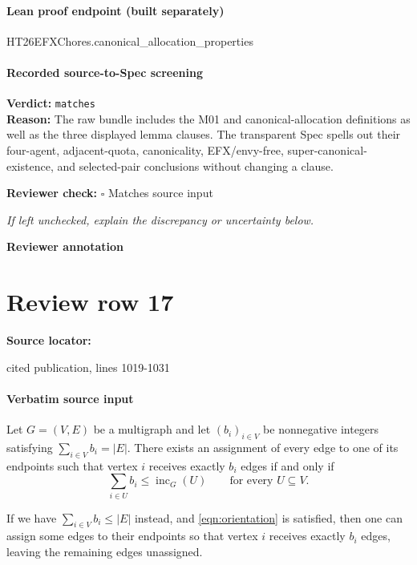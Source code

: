 \documentclass[10pt]{article}
\newcommand{\reviewerbox}{%
  \par\noindent\fbox{\parbox{0.96\linewidth}{\rule{0pt}{0.38in}}}\par
}
\newcommand{\reviewmatch}[1]{%
  \par\noindent\textbf{Reviewer check:} $\square$\; #1\par
  \noindent\emph{If left unchecked, explain the discrepancy or uncertainty below.}\par
}
\begin{document}
\paragraph{Lean proof endpoint (built separately)}\begin{ReviewVerbatim}
HT26EFXChores.canonical_allocation_properties
\end{ReviewVerbatim}

\paragraph{Recorded source-to-Spec screening}
\textbf{Verdict:} \texttt{matches}
\\
\textbf{Reason:} The raw bundle includes the M01 and canonical-allocation definitions as well as the three displayed lemma clauses. The transparent Spec spells out their four-agent, adjacent-quota, canonicality, EFX/envy-free, super-canonical-existence, and selected-pair conclusions without changing a clause.
\reviewmatch{Matches source input}
\noindent\textbf{Reviewer annotation}\par
\reviewerbox
\clearpage
\hypertarget{source-claim-0869bc0832b92b55}{}
\section*{Review row 17}
\textbf{Source locator:} {\footnotesize\raggedright cited publication, lines 1019-\allowbreak{}1031\par}
\paragraph{Verbatim source input}
\begin{ReviewVerbatim}
\begin{lemma}\label{lem:balancedorientation}
Let $G=(V,E)$ be a multigraph and let $(b_i)_{i\in V}$ be nonnegative
integers satisfying $\sum_{i\in V}b_i=|E|$.  There exists an assignment of
every edge to one of its endpoints such that vertex $i$ receives exactly
$b_i$ edges if and only if
\begin{equation}\label{eqn:orientation}
    \sum_{i\in U}b_i\le \operatorname{inc}_G(U)
 \qquad\text{for every }U\subseteq V.
\end{equation}

If we have \(\sum_{i\in V}b_i\le |E|\) instead, and \eqref{eqn:orientation} is satisfied, then one can assign some edges to their endpoints so that vertex \(i\)
receives exactly \(b_i\) edges, leaving the remaining edges unassigned.
\end{lemma}
\end{ReviewVerbatim}
\end{document}
